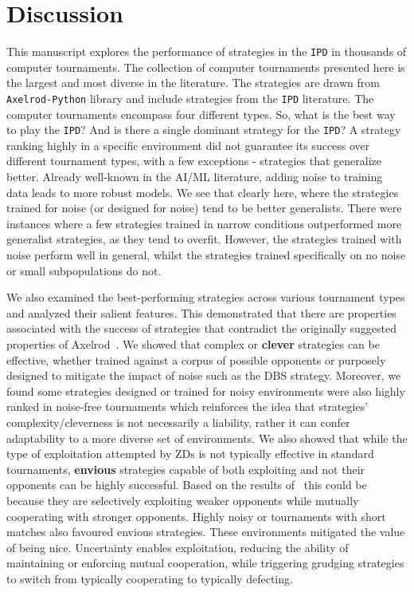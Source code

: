 \documentclass{article}
\newcommand{\numberofstrategies}{}
\def\axelrod{\texttt{Axelrod-Python}}
\def\IPD{\texttt{IPD}}
\begin{document}
\section{Discussion}\label{section:conclusion}

This manuscript explores the performance of \numberofstrategies strategies in
the \IPD{} in thousands of computer tournaments. The collection of computer
tournaments presented here is the largest and most diverse in the literature.
The \numberofstrategies strategies are drawn from \axelrod{} library and include
strategies from the \IPD{} literature. The computer tournaments encompass four
different types. So, what is the best way to play the \IPD{}? And is there a
single dominant strategy for the \IPD{}?
A strategy ranking highly in a
specific environment did not guarantee its success over different tournament
types, with a few exceptions - strategies that generalize better. Already
well-known in the AI/ML literature, adding noise to training data leads to more
robust models. We see that clearly here, where the strategies trained for noise
(or designed for noise) tend to be better generalists. There were instances
where a few strategies trained in narrow conditions outperformed more generalist
strategies, as they tend to overfit. However, the strategies trained with noise
perform well in general, whilst the strategies trained specifically on no noise
or small subpopulations do not.

We also examined the best-performing strategies across various tournament
types and analyzed their salient features. This demonstrated that there are
properties associated with the success of strategies that contradict the
originally suggested properties of Axelrod~\cite{Axelrod1981}.
We showed that complex or \textbf{clever} strategies can be effective, whether
trained against a corpus of possible opponents or purposely designed to mitigate
the impact of noise such as the DBS strategy. Moreover, we found some
strategies designed or trained for noisy environments were also highly ranked in
noise-free tournaments which reinforces the idea that strategies'
complexity/cleverness is not necessarily a liability, rather it can confer
adaptability to a more diverse set of environments.
We also showed that while the type of exploitation attempted by ZDs is
not typically effective in standard tournaments, \textbf{envious} strategies
capable of both exploiting and not their opponents can be highly successful.
Based on the results of~\cite{Harper2017} this could be because they are
selectively exploiting weaker opponents while mutually cooperating with stronger
opponents. Highly noisy or tournaments with short matches also favoured envious
strategies. These environments mitigated the value of being nice. Uncertainty
enables exploitation, reducing the ability of maintaining or enforcing mutual
cooperation, while triggering grudging strategies to switch from typically
cooperating to typically defecting.
\end{document}
